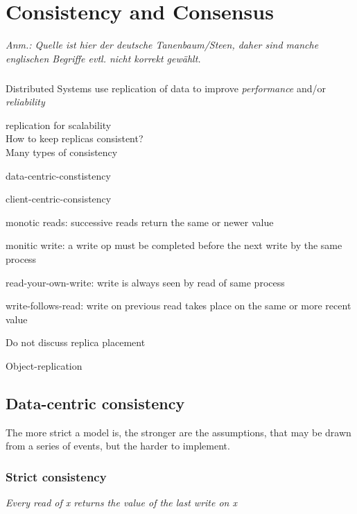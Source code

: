 \chapter{Consistency and Consensus}
\emph{Anm.: Quelle ist hier der deutsche Tanenbaum/Steen, daher sind manche englischen Begriffe evtl. nicht korrekt gewählt.}

\paragraph{}
\begin{compactitem}
	\item Distributed Systems use replication of data to improve \emph{performance} and/or \emph{reliability}
	\item replication for scalability\\
	How to keep replicas consistent?\\
	Many types of consistency\\
	\begin{compactitem}
		\item data-centric-constistency
		\item client-centric-consistency
	\item monotic reads: successive reads return the same or newer value
	\item monitic write: a write op must be completed before the next write by the same process
	\item read-your-own-write: write is always seen by read of same process
	\item write-follows-read: write on previous read takes place on the same or more recent value
	\end{compactitem}
	\item Do not discuss replica placement
        \item Object-replication
\end{compactitem}
\section{Data-centric consistency}
The more strict a model is, the stronger are the assumptions, that may be drawn from a series of events, but the harder to implement.

\subsection{Strict consistency}
\emph{Every read of x returns the value of the last write on x}
